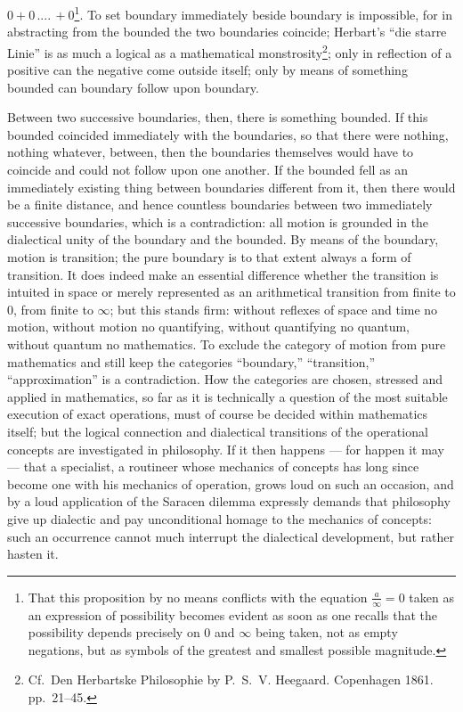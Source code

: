 \documentclass[12pt,a4paper]{book}
\begin{document}
$0 + 0\,....\,+ 0$\footnote{That this proposition by no means conflicts with
the equation $\frac{a}{\infty} = 0$ taken as an expression of possibility
becomes evident as soon as one recalls that the possibility depends precisely
on $0$ and $\infty$ being taken, not as empty negations, but as symbols of the
greatest and smallest possible magnitude.}. To set boundary immediately beside
boundary is impossible, for in abstracting from the bounded the two boundaries
coincide; Herbart's ``die
starre Linie'' is as much a logical as a mathematical
monstrosity\footnote{Cf.\ Den Herbartske Philosophie by P.~S.~V. Heegaard.
Copenhagen 1861. pp.~21--45.}; only in reflection of a positive can the
negative come outside itself; only by means of something bounded can boundary
follow upon boundary.

Between two successive boundaries, then, there is something bounded. If this
bounded coincided immediately with the boundaries, so that there were nothing,
nothing whatever, between, then the boundaries themselves would have to
coincide and could not follow upon one another. If the bounded fell as an
immediately existing thing between boundaries different from it, then there
would be a finite distance, and hence countless boundaries between two
immediately successive boundaries, which is a contradiction: all motion is
grounded in the dialectical unity of the boundary and the bounded. By means of
the boundary, motion is transition; the pure boundary is to that extent always
a form of transition. It does indeed make an essential difference whether the
transition is intuited in space or merely represented as an arithmetical
transition from finite to $0$, from finite to $\infty$; but this stands firm:
without reflexes of space and time no motion, without motion
no quantifying, without quantifying no quantum, without quantum no mathematics.
To exclude the category of motion from pure mathematics and still keep the
categories ``boundary,'' ``transition,'' ``approximation'' is a contradiction.
How the categories are chosen, stressed and applied in mathematics, so far as
it is technically a question of the most suitable execution of exact
operations, must of course be decided within mathematics itself; but the
logical connection and dialectical transitions of the operational concepts are
investigated in philosophy. If it then happens --- for happen it may --- that a
specialist, a routineer whose mechanics of concepts has long since become one
with his mechanics of operation, grows loud on such an occasion, and by a loud
application of the Saracen dilemma expressly demands that philosophy give up
dialectic and pay unconditional homage to the mechanics of concepts: such an
occurrence cannot much interrupt the dialectical development, but rather
hasten it.
\end{document}
